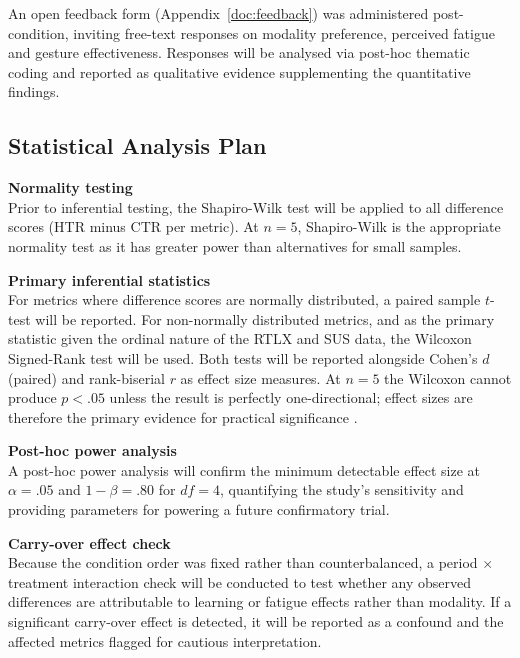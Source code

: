 An open feedback form (Appendix~\ref{doc:feedback}) was administered post-condition, inviting free-text responses on modality preference, perceived fatigue and gesture effectiveness. Responses will be analysed via post-hoc thematic coding and reported as qualitative evidence supplementing the quantitative findings.


\subsection{Statistical Analysis Plan}
\label{sec:stat_plan}

\textbf{Normality testing} \\
Prior to inferential testing, the Shapiro-Wilk test will be applied to all difference scores (HTR minus CTR per metric). At $n = 5$, Shapiro-Wilk is the appropriate normality test as it has greater power than alternatives for small samples.

\textbf{Primary inferential statistics} \\
For metrics where difference scores are normally distributed, a paired sample $t$-test will be reported. For non-normally distributed metrics, and as the primary statistic given the ordinal nature of the RTLX and SUS data, the Wilcoxon Signed-Rank test will be used. Both tests will be reported alongside Cohen's $d$ (paired) and rank-biserial $r$ as effect size measures. At $n = 5$ the Wilcoxon cannot produce $p < .05$ unless the result is perfectly one-directional; effect sizes are therefore the primary evidence for practical significance \citep{Wobbrock2011TheProcedures}.

\textbf{Post-hoc power analysis} \\
A post-hoc power analysis will confirm the minimum detectable effect size at $\alpha = .05$ and $1 - \beta = .80$ for $df = 4$, quantifying the study's sensitivity and providing parameters for powering a future confirmatory trial.

\textbf{Carry-over effect check} \\
Because the condition order was fixed rather than counterbalanced, a period $\times$ treatment interaction check will be conducted to test whether any observed differences are attributable to learning or fatigue effects rather than modality. If a significant carry-over effect is detected, it will be reported as a confound and the affected metrics flagged for cautious interpretation.

